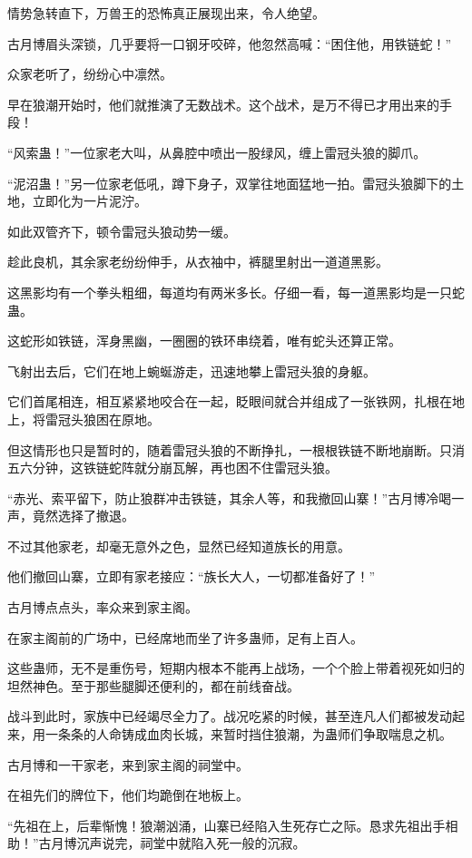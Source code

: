 \begin{this_body}
情势急转直下，万兽王的恐怖真正展现出来，令人绝望。

古月博眉头深锁，几乎要将一口钢牙咬碎，他忽然高喊：“困住他，用铁链蛇！”

众家老听了，纷纷心中凛然。

早在狼潮开始时，他们就推演了无数战术。这个战术，是万不得已才用出来的手段！

“风索蛊！”一位家老大叫，从鼻腔中喷出一股绿风，缠上雷冠头狼的脚爪。

“泥沼蛊！”另一位家老低吼，蹲下身子，双掌往地面猛地一拍。雷冠头狼脚下的土地，立即化为一片泥泞。

如此双管齐下，顿令雷冠头狼动势一缓。

趁此良机，其余家老纷纷伸手，从衣袖中，裤腿里射出一道道黑影。

这黑影均有一个拳头粗细，每道均有两米多长。仔细一看，每一道黑影均是一只蛇蛊。

这蛇形如铁链，浑身黑幽，一圈圈的铁环串绕着，唯有蛇头还算正常。

飞射出去后，它们在地上蜿蜒游走，迅速地攀上雷冠头狼的身躯。

它们首尾相连，相互紧紧地咬合在一起，眨眼间就合并组成了一张铁网，扎根在地上，将雷冠头狼困在原地。

但这情形也只是暂时的，随着雷冠头狼的不断挣扎，一根根铁链不断地崩断。只消五六分钟，这铁链蛇阵就分崩瓦解，再也困不住雷冠头狼。

“赤光、索平留下，防止狼群冲击铁链，其余人等，和我撤回山寨！”古月博冷喝一声，竟然选择了撤退。

不过其他家老，却毫无意外之色，显然已经知道族长的用意。

他们撤回山寨，立即有家老接应：“族长大人，一切都准备好了！”

古月博点点头，率众来到家主阁。

在家主阁前的广场中，已经席地而坐了许多蛊师，足有上百人。

这些蛊师，无不是重伤号，短期内根本不能再上战场，一个个脸上带着视死如归的坦然神色。至于那些腿脚还便利的，都在前线奋战。

战斗到此时，家族中已经竭尽全力了。战况吃紧的时候，甚至连凡人们都被发动起来，用一条条的人命铸成血肉长城，来暂时挡住狼潮，为蛊师们争取喘息之机。

古月博和一干家老，来到家主阁的祠堂中。

在祖先们的牌位下，他们均跪倒在地板上。

“先祖在上，后辈惭愧！狼潮汹涌，山寨已经陷入生死存亡之际。恳求先祖出手相助！”古月博沉声说完，祠堂中就陷入死一般的沉寂。


\end{this_body}
